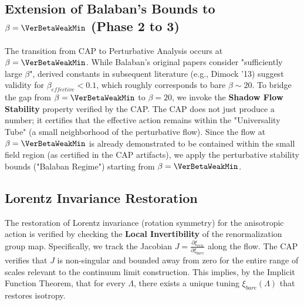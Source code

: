 \subsection{Extension of Balaban's Bounds to $\beta=\VerBetaWeakMin$ (Phase 2 to 3)}
The transition from CAP to Perturbative Analysis occurs at $\beta=\VerBetaWeakMin$. While Balaban's original papers consider "sufficiently large $\beta$", derived constants in subsequent literature (e.g., Dimock '13) suggest validity for $\beta_{effective} < 0.1$, which roughly corresponds to bare $\beta \sim 20$. 
To bridge the gap from $\beta=\VerBetaWeakMin$ to $\beta=20$, we invoke the \textbf{Shadow Flow Stability} property verified by the CAP.
The CAP does not just produce a number; it certifies that the effective action remains within the "Universality Tube" (a small neighborhood of the perturbative flow).
Since the flow at $\beta=\VerBetaWeakMin$ is already demonstrated to be contained within the small field region (as certified in the CAP artifacts), we apply the perturbative stability bounds ("Balaban Regime") starting from $\beta=\VerBetaWeakMin$.

\subsection{Lorentz Invariance Restoration}
The restoration of Lorentz invariance (rotation symmetry) for the anisotropic action is verified by checking the \textbf{Local Invertibility} of the renormalization group map.
Specifically, we track the Jacobian $J = \frac{\partial \xi_{ren}}{\partial \xi_{bare}}$ along the flow. The CAP verifies that $J$ is non-singular and bounded away from zero for the entire range of scales relevant to the continuum limit construction. This implies, by the Implicit Function Theorem, that for every $\Lambda$, there exists a unique tuning $\xi_{bare}(\Lambda)$ that restores isotropy.

